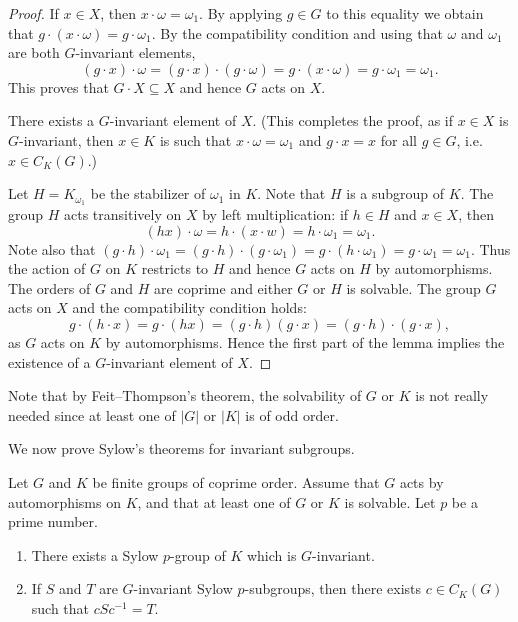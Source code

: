 \begin{proof}
	If $x\in X$, then $x\cdot\omega=\omega_1$. By applying $g\in G$ to this equality we obtain that 
	$g\cdot (x\cdot \omega)=g\cdot\omega_1$. By the compatibility condition and using that
	$\omega$ and $\omega_1$ are both $G$-invariant elements, 
	\[
	(g\cdot x)\cdot \omega=(g\cdot x)\cdot (g\cdot\omega)= g\cdot (x\cdot \omega)=g\cdot\omega_1=\omega_1.
	\]
	This proves that $G\cdot X\subseteq X$ and hence $G$ acts on $X$. 
	
	\begin{claim}
		There exists a $G$-invariant element of $X$. (This completes the proof, 
		as if $x\in X$ is $G$-invariant, then $x\in K$ is such that 
		$x\cdot \omega=\omega_1$ and $g\cdot x=x$ for all $g\in G$, i.e.   
		$x\in C_K(G)$.)
	\end{claim}

	Let $H=K_{\omega_1}$ be  the stabilizer of $\omega_1$ in $K$. Note that $H$ is a subgroup of $K$. The group 
	$H$ acts transitively on $X$ by left multiplication: if $h\in H$ and $x\in X$, then
	\[
	(hx)\cdot\omega=h\cdot (x\cdot w)=h\cdot\omega_1=\omega_1.
	\]
	Note also that $(g\cdot h)\cdot \omega_1=(g\cdot h)\cdot (g\cdot \omega_1)=g\cdot (h\cdot \omega_1)=g\cdot \omega_1=\omega_1$.
	Thus the action of $G$ on $K$ restricts to $H$ and hence
	$G$ acts on $H$ by automorphisms. The orders
	of $G$ and $H$ are coprime and either $G$ or $H$ is solvable. 
	The group $G$ acts on $X$ 
	and the compatibility condition holds:
	\[
	g\cdot (h\cdot x)=g\cdot(hx)=(g\cdot h)(g\cdot x)= (g\cdot h)\cdot (g\cdot x), 
	\]
	as $G$ acts on $K$ by automorphisms. Hence the first part of the 
	lemma implies the existence of a $G$-invariant element of $X$. 
\end{proof}
Note that by Feit--Thompson's theorem, the solvability of $G$ or $K$ is not really needed 
since at least one of $|G|$ or $|K|$ is of odd order. 



We now prove Sylow's theorems for invariant 
subgroups.

\begin{theorem} \label{thm:InvariantSylow}
	 Let $G$ and $K$ be 
	finite groups of coprime order. Assume that $G$ acts by automorphisms on $K$,
and that 
	at least one of $G$ or $K$ is solvable. Let $p$ be a prime number.
	\begin{enumerate}
		\item There exists a Sylow $p$-group of $K$ which is $G$-invariant.
		\item If $S$ and $T$ are $G$-invariant Sylow $p$-subgroups, then there exists 
		$c\in C_K(G)$ such that $cSc^{-1}=T$. 
	\end{enumerate}
\end{theorem}

